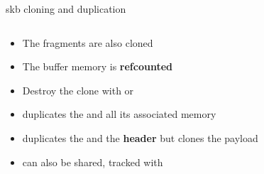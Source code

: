\begin{frame}{skb cloning and duplication}
\begin{columns}
\begin{column}{0.7\textwidth}
\begin{itemize}
				\item The fragments are also cloned
				\item The buffer memory is \textbf{refcounted}
				\item Destroy the clone with  or 
				\item {} duplicates the  and all its associated memory
				\item {} duplicates the  and the \textbf{header} but clones the payload
				\item {} can also be shared, tracked with 
			\end{itemize}
		\end{column}
	\end{columns}
\end{frame}

